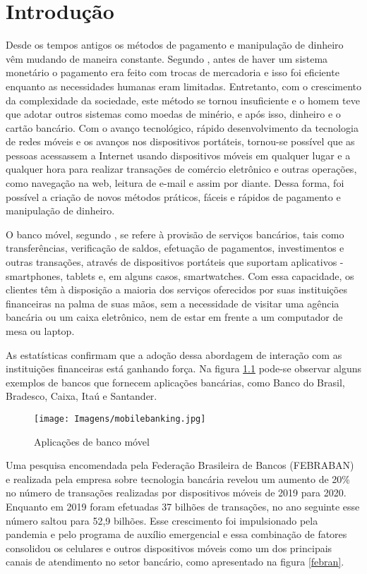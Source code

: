 
    \chapter{Introdução}

    Desde os tempos antigos os m\'{e}todos de pagamento e manipulação de dinheiro vêm mudando de maneira constante. Segundo , antes de haver um sistema monetário o pagamento era feito com trocas de mercadoria e isso foi eficiente enquanto as necessidades humanas eram limitadas. Entretanto, com o crescimento da complexidade da sociedade, este método se tornou insuficiente e o homem teve que adotar outros sistemas como moedas de minério, e após isso, dinheiro e o cart\~{a}o banc\'{a}rio. Com o avanço tecnológico, rápido desenvolvimento da tecnologia de redes móveis e os avanços nos dispositivos portáteis, tornou-se possível que as pessoas acessassem a Internet usando dispositivos móveis em qualquer lugar e a qualquer hora para realizar transações de comércio eletrônico e outras operações, como navegação na web, leitura de e-mail e assim por diante. Dessa forma, foi possível a criação de novos m\'{e}todos pr\'{a}ticos, fáceis e r\'{a}pidos de pagamento e manipulação de dinheiro.
    
    
    O banco móvel, segundo , se refere à provisão de serviços bancários, tais como transferências, verificação de saldos, efetuação de pagamentos, investimentos e outras transações, através de dispositivos portáteis que suportam aplicativos - smartphones, tablets e, em alguns casos, smartwatches. Com essa capacidade, os clientes têm à disposição a maioria dos serviços oferecidos por suas instituições financeiras na palma de suas mãos, sem a necessidade de visitar uma agência bancária ou um caixa eletrônico, nem de estar em frente a um computador de mesa ou laptop. 
    
    As estatísticas \cite{Deloitte2021} confirmam que a adoção dessa abordagem de interação com as instituições financeiras está ganhando força. Na figura \ref{MobileBanking} pode-se observar alguns exemplos de bancos que fornecem aplicações bancárias, como Banco do Brasil, Bradesco, Caixa, Itaú e Santander.

    \begin{figure}[H]
    \centering 
    \texttt{[image: Imagens/mobilebanking.jpg]}
    \caption{Aplicações de banco móvel}
    \label{MobileBanking}
    \end{figure}
    
    Uma pesquisa encomendada pela Federação Brasileira de Bancos (FEBRABAN) e realizada pela empresa  sobre tecnologia bancária revelou um aumento de 20\% no número de transações realizadas por dispositivos móveis de 2019 para 2020. Enquanto em 2019 foram efetuadas 37 bilhões de transações, no ano seguinte esse número saltou para 52,9 bilhões. Esse crescimento foi impulsionado pela pandemia e pelo programa de auxílio emergencial e essa combinação de fatores consolidou os celulares e outros dispositivos móveis como um dos principais canais de atendimento no setor bancário, como apresentado na figura \ref{febran}.
    
